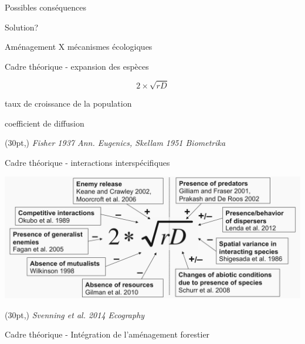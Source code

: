 \documentclass[11pt, compress, aspectratio=1610]{beamer}
\newcommand\smallcitation[1]{%
\begin{textblock*}{\textwidth}(30pt,\textheight)
	\raggedleft \footnotesize\textit{#1}
\end{textblock*}}
\providecommand{\tightlist}{%
  \setlength{\itemsep}{0pt}\setlength{\parskip}{0pt}}
\begin{document}
\begin{frame}{Possibles conséquences}
\begin{center}
\begin{tikzpicture}
  \end{tikzpicture}
\end{center}

\end{frame}

\begin{frame}{Solution?}


Aménagement X mécanismes écologiques

\end{frame}

\begin{frame}{Cadre théorique - expansion des espèces}

\begin{LARGE}
$$ 2 \times \sqrt{rD} $$
\end{LARGE}

\begin{description}
\tightlist
\item[r]
taux de croissance de la population
\item[D]
coefficient de diffusion
\end{description}

\smallcitation{Fisher 1937 Ann. Eugenics, Skellam 1951 Biometrika}

\end{frame}

\begin{frame}{Cadre théorique - interactions interspécifiques}

\centering
 \includegraphics[scale=0.8]{figures/Svenning2014.png}\par

\smallcitation{Svenning et al. 2014 Ecography}

\end{frame}

\begin{frame}{Cadre théorique - Intégration de l'aménagement forestier}

\centering
 \par

\end{frame}
\end{document}
